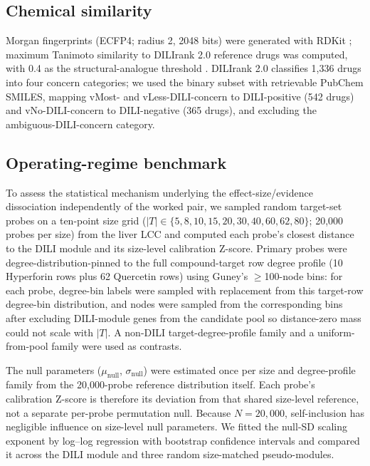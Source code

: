 \subsection{Chemical similarity}
Morgan fingerprints (ECFP4; radius 2, 2048 bits) were generated with RDKit \citep{RDKit2026}; maximum Tanimoto similarity to DILIrank 2.0 reference drugs \citep{Chen2016, Olubamiwa2025} was computed, with 0.4 as the structural-analogue threshold \citep{Maggiora2014}. DILIrank 2.0 classifies 1{,}336 drugs into four concern categories; we used the binary subset with retrievable PubChem SMILES, mapping vMost- and vLess-DILI-concern to DILI-positive (542 drugs) and vNo-DILI-concern to DILI-negative (365 drugs), and excluding the ambiguous-DILI-concern category.

\subsection{Operating-regime benchmark}
To assess the statistical mechanism underlying the effect-size/evidence dissociation independently of the worked pair, we sampled random target-set probes on a ten-point size grid ($|T|\in\{5,8,10,15,20,30,40,60,62,80\}$; 20{,}000 probes per size) from the liver LCC and computed each probe's closest distance to the DILI module and its size-level calibration Z-score. Primary probes were degree-distribution-pinned to the full compound-target row degree profile (10 Hyperforin rows plus 62 Quercetin rows) using Guney's $\geq$100-node bins: for each probe, degree-bin labels were sampled with replacement from this target-row degree-bin distribution, and nodes were sampled from the corresponding bins after excluding DILI-module genes from the candidate pool so distance-zero mass could not scale with $|T|$. A non-DILI target-degree-profile family and a uniform-from-pool family were used as contrasts.

The null parameters ($\mu_{\text{null}}$, $\sigma_{\text{null}}$) were estimated once per size and degree-profile family from the 20{,}000-probe reference distribution itself. Each probe's calibration Z-score is therefore its deviation from that shared size-level reference, not a separate per-probe permutation null. Because $N=20{,}000$, self-inclusion has negligible influence on size-level null parameters. We fitted the null-SD scaling exponent by log--log regression with bootstrap confidence intervals and compared it across the DILI module and three random size-matched pseudo-modules.

